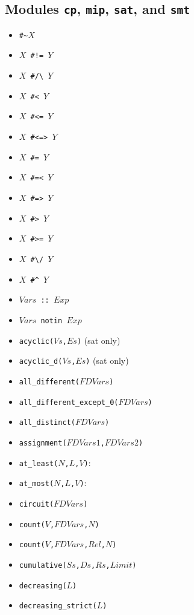 \documentclass[10pt]{article}
\begin{document}
\begin{multicols}{2}
\section*{Modules \texttt{cp}, \texttt{mip}, \texttt{sat}, and \texttt{smt}}
\begin{scriptsize}
\begin{itemize}
    \item {\tt \verb+#~+$X$}
    \item {\tt $X$ \verb+#!=+ $Y$} 
    \item {\tt $X$ \verb+#/\+ $Y$}
    \item {\tt $X$ \verb+#<+ $Y$} 
    \item {\tt $X$ \verb+#<=+ $Y$}
    \item {\tt $X$ \verb+#<=>+ $Y$}
    \item {\tt $X$ \verb+#=+ $Y$} 
    \item {\tt $X$ \verb+#=<+ $Y$} 
    \item {\tt $X$ \verb+#=>+ $Y$}
    \item {\tt $X$ \verb+#>+ $Y$} 
    \item {\tt $X$ \verb+#>=+ $Y$} 
    \item {\tt $X$ \verb+#\/+ $Y$}
    \item {\tt $X$ \verb+#^+ $Y$}
\item \texttt{$Vars$ :: $Exp$}
\item \texttt{$Vars$ notin $Exp$}
\item \texttt{acyclic($Vs$,$Es$)} (sat only)
\item \texttt{acyclic\_d($Vs$,$Es$)} (sat only)       
\item \texttt{all\_different($FDVars$)}
\item \texttt{all\_different\_except\_0($FDVars$)}
\item \texttt{all\_distinct($FDVars$)}
\item \texttt{assignment($FDVars1$,$FDVars2$)}
\item \texttt{at\_least($N$,$L$,$V$)}:
\item \texttt{at\_most($N$,$L$,$V$)}: 
\item \texttt{circuit($FDVars$)}
\item \texttt{count($V$,$FDVars$,$N$)}
\item \texttt{count($V$,$FDVars$,$Rel$,$N$)}
\item \texttt{cumulative($Ss$,$Ds$,$Rs$,$Limit$)}
\item \texttt{decreasing($L$)}
\item \texttt{decreasing\_strict($L$)}

\end{itemize}
\end{scriptsize}
\end{multicols}
\end{document}
